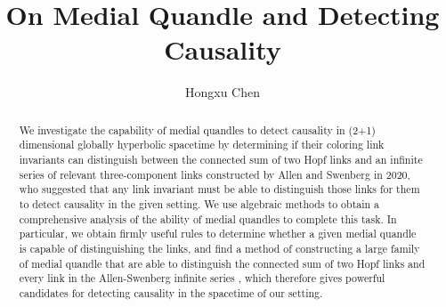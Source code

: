 \documentclass[12pt, letterpaper]{article}
\theoremstyle{plain}
\theoremstyle{definition}
\begin{document}
\title{On Medial Quandle and Detecting Causality}
\author{Hongxu Chen \date{} } \maketitle

\begin{abstract}
We investigate the capability of medial quandles to detect causality in (2+1) dimensional globally
hyperbolic spacetime by determining if their coloring link invariants can distinguish between the connected sum of two
Hopf links and an infinite series of relevant three-component links constructed by Allen and
Swenberg in 2020, who suggested that any link invariant must be able to distinguish those
links for them to detect causality in the given setting. We use algebraic methods to obtain a comprehensive analysis of the ability of medial quandles to complete this task. In particular, we obtain firmly useful rules to determine whether a given medial quandle is capable of distinguishing the links, and find a method of constructing a large family of medial quandle that are able to distinguish the connected sum of two Hopf links and every link in the Allen-Swenberg infinite series , which therefore gives powerful candidates for detecting causality in the spacetime of our setting.
\end{abstract}

\tableofcontents
\end{document}
